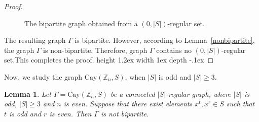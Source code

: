 \documentclass[12pt]{article}
\def\bull{\vrule height 1.2ex width 1ex depth -.1ex }
\newtheorem{lem}[formula]{Lemma}
\begin{document}
\begin{proof}
\begin{figure}[H]
\caption{\footnotesize The bipartite graph obtained from a $(0,|S|)$-regular set.}	
\end{figure}
The resulting graph $\Gamma$ is bipartite. However, according to  Lemma~\ref{nonbipartite}, the graph $\Gamma$ is non-bipartite. Therefore, graph $\Gamma$  contains no $(0,|S|)$-regular set.This completes the proof. \hfill\bull
\end{proof}	
Now, we study the graph $\mathrm{Cay}(\mathbb{Z}_n, S)$, when  $|S|$ is odd and $|S|\geq3 $.
\begin{lem}\label{nonbipartite-odd}
	Let $\Gamma = \mathrm{Cay}(\mathbb{Z}_n, S)$ be a connected $|S|$-regular graph, where $|S|$ is odd, $|S|\geq3$ and $n$ is even. Suppose that there exist elements $x^t, x^r \in S$ such that $t$ is odd and $r$ is even. Then $\Gamma$ is not bipartite.	
\end{lem}
\end{document}
